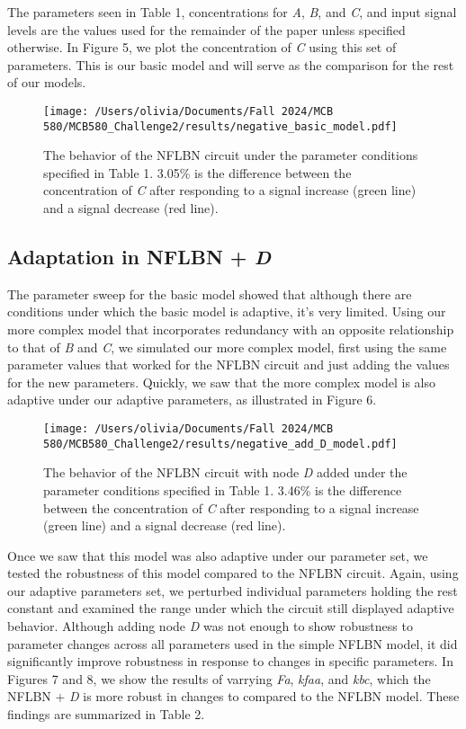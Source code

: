 \documentclass{article}
\begin{document}
The parameters seen in Table 1, concentrations for \textit{A}, \textit{B}, and \textit{C}, and input signal levels are the values used for the remainder of the paper unless specified otherwise. In Figure 5, we plot the concentration of \textit{C} using this set of parameters. This is our basic model and will serve as the comparison for the rest of our models. 

\begin{figure}[H]
    \centering
    \texttt{[image: /Users/olivia/Documents/Fall 2024/MCB 580/MCB580\_Challenge2/results/negative\_basic\_model.pdf]}
    \caption{The behavior of the NFLBN circuit under the parameter conditions specified in Table 1. 3.05\% is the difference between the concentration of \textit{C} after responding to a signal increase (green line) and a signal decrease (red line).}
    \label{fig:5}
\end{figure}

\subsection{Adaptation in NFLBN + \textit{D}}

The parameter sweep for the basic model showed that although there are conditions under which the basic model is adaptive, it's very limited. Using our more complex model that incorporates redundancy with an opposite relationship to that of \textit{B} and \textit{C}, we simulated our more complex model, first using the same parameter values that worked for the NFLBN circuit and just adding the values for the new parameters. Quickly, we saw that the more complex model is also adaptive under our adaptive parameters, as illustrated in Figure 6. 

\begin{figure}[H]
    \centering
    \texttt{[image: /Users/olivia/Documents/Fall 2024/MCB 580/MCB580\_Challenge2/results/negative\_add\_D\_model.pdf]}
    \caption{The behavior of the NFLBN circuit with node \textit{D} added under the parameter conditions specified in Table 1. 3.46\% is the difference between the concentration of \textit{C} after responding to a signal increase (green line) and a signal decrease (red line).}
    \label{fig:6}
\end{figure}

Once we saw that this model was also adaptive under our parameter set, we tested the robustness of this model compared to the NFLBN circuit. Again, using our adaptive parameters set, we perturbed individual parameters holding the rest constant and examined the range under which the circuit still displayed adaptive behavior. Although adding node \textit{D} was not enough to show robustness to parameter changes across all parameters used in the simple NFLBN model, it did significantly improve robustness in response to changes in specific parameters. In Figures 7 and 8, we show the results of varrying \textit{Fa}, \textit{kfaa}, and \textit{kbc}, which the NFLBN + \textit{D} is more robust in changes to compared to the NFLBN model. These findings are summarized in Table 2. 
\end{document}
